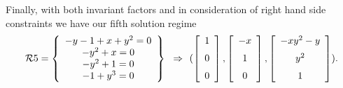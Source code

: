 %
%
%
%
Finally, with both invariant factors and in consideration of right hand side constraints we 
have our fifth solution regime
\[\RR5 = 
\breg -y-1+x+{y}^{2}=0\\-{y}^{2}+x=0\\-{y}^{2}+1=0\\-1+{y}^{3}=0\ereg \implies
(\left [\begin {array}{c} 1\\\noalign{\medskip}0\\\noalign{\medskip}0
\end {array}\right ]
,%
\left [\begin {array}{c} -x\\\noalign{\medskip}1\\\noalign{\medskip}0
\end {array}\right ]
,%
\left [\begin {array}{c} -x{y}^{2}-y\\\noalign{\medskip}{y}^{2}\\\noalign{\medskip}
1\end {array}\right ]
).
\]


